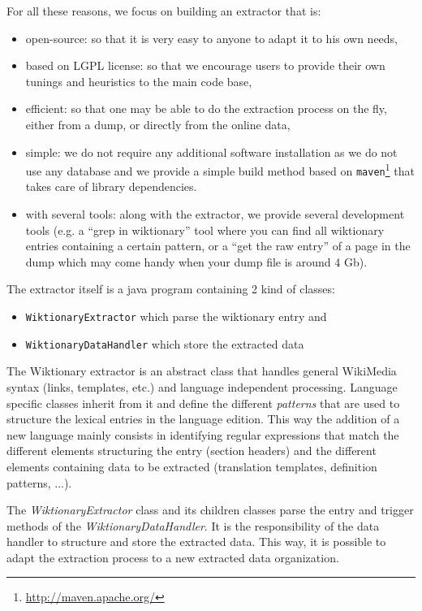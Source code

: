 \documentclass[10pt, a4paper]{article}
\begin{document}
For all these reasons, we focus on building an extractor that is:

\begin{itemize}
\item open-source: so that it is very easy to anyone to adapt it to his own needs,
\item based on LGPL license: so that we encourage users to provide their own tunings and heuristics to the main code base,
\item efficient: so that one may be able to do the extraction process on the fly, either from a dump, or directly from the online data, 
\item simple: we do not require any additional software installation as we do not use any database and we provide a simple build method based on \texttt{maven}\footnote{\url{http://maven.apache.org/}} that takes care of library dependencies.
\item with several tools: along with the extractor, we provide several development tools (e.g. a ``grep in wiktionary'' tool where you can find all wiktionary entries containing a certain pattern, or a ``get the raw entry'' of a page in the dump which may come handy when your dump file is around 4 Gb). 
\end{itemize}

The extractor itself is a java program containing 2 kind of classes:

\begin{itemize}
\item \texttt{WiktionaryExtractor} which parse the wiktionary entry and
\item \texttt{WiktionaryDataHandler} which store the extracted data
\end{itemize}

The Wiktionary extractor is an abstract class that handles general WikiMedia syntax (links, templates, etc.) and language independent processing. Language specific classes inherit from it and define the different \emph{patterns} that are used to structure the lexical entries in the language edition. This way the addition of a new language mainly consists in identifying regular expressions that match the different elements structuring the entry (section headers) and the different elements containing data to be extracted (translation templates, definition patterns, ...).

The \emph{WiktionaryExtractor} class and its children classes parse the entry and trigger methods of the \emph{WiktionaryDataHandler}. It is the responsibility of the data handler to structure and store the extracted data. This way, it is possible to adapt the extraction process to a new extracted data organization.
\end{document}
